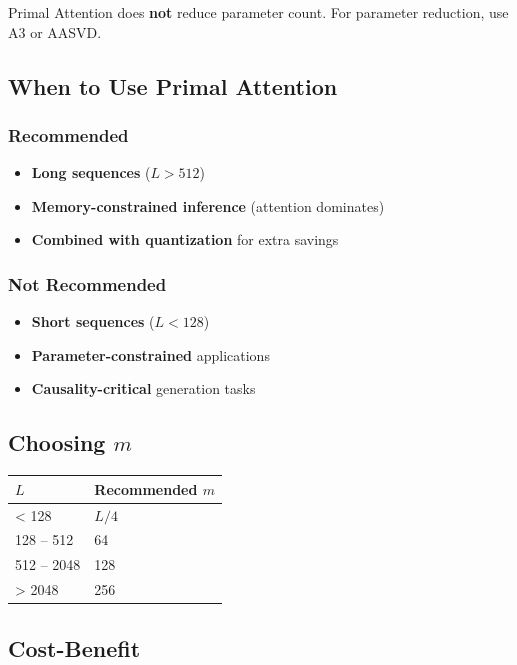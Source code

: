 Primal Attention does \textbf{not} reduce parameter count. For parameter 
reduction, use A3 or AASVD.

\subsection{When to Use Primal Attention}

\subsubsection{Recommended}

\begin{itemize}
\item \textbf{Long sequences} ($L > 512$)
\item \textbf{Memory-constrained inference} (attention dominates)
\item \textbf{Combined with quantization} for extra savings

\end{itemize}
\subsubsection{Not Recommended}

\begin{itemize}
\item \textbf{Short sequences} ($L < 128$)
\item \textbf{Parameter-constrained} applications
\item \textbf{Causality-critical} generation tasks

\end{itemize}
\subsection{Choosing $m$}

\begin{table}[H]
\centering
\small
\begin{tabular}{ll}
\toprule
\textbf{$L$} & \textbf{Recommended $m$} \\
\midrule
\textless{} 128 & $L / 4$ \\
128 -- 512 & 64 \\
512 -- 2048 & 128 \\
\textgreater{} 2048 & 256 \\
\bottomrule
\end{tabular}
\end{table}

\subsection{Cost-Benefit}


